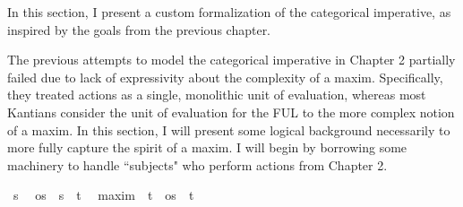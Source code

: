 %
\begin{isabellebody}%
%
%
\isadelimtheory
%
\endisadelimtheory
%
\isatagtheory
%
\endisatagtheory
{\isafoldtheory}%
%
\isadelimtheory
%
\endisadelimtheory
%
\isadelimdocument
%
\endisadelimdocument
%
\isatagdocument
%
\isamarkuptrue%
%
\endisatagdocument
{\isafolddocument}%
%
\isadelimdocument
%
\endisadelimdocument
%
\begin{isamarkuptext}%
In this section, I present a custom formalization of the categorical imperative, as inspired by 
the goals from the previous chapter.%
\end{isamarkuptext}\isamarkuptrue%
%
\isadelimdocument
%
\endisadelimdocument
%
\isatagdocument
%
\isamarkuptrue%
%
\endisatagdocument
{\isafolddocument}%
%
\isadelimdocument
%
\endisadelimdocument
%
\begin{isamarkuptext}%
The previous attempts to model the categorical imperative in Chapter 2 partially failed due to 
lack of expressivity about the complexity of a maxim. Specifically, they treated actions as a single, 
monolithic unit of evaluation, whereas most Kantians consider the unit of evaluation for the FUL to the more
complex notion of a maxim. In this section, I will present some logical background necessarily to more fully 
capture the spirit of a maxim. I will begin by borrowing some machinery to handle ``subjects" who perform 
actions from Chapter 2.%
\end{isamarkuptext}\isamarkuptrue%
\isamarkupfalse%
\ s\ %
\isanewline
{}\isamarkupfalse%
\ os\ {\isacharequal}\ {\isachardoublequoteopen}{\isacharparenleft}s\ {\isasymRightarrow}\ t{\isacharparenright}{\isachardoublequoteclose}\ %
\isanewline
\isanewline
{}\isamarkupfalse%
\ maxim\ {\isacharequal}\ {\isachardoublequoteopen}{\isacharparenleft}t\ {\isacharasterisk}\ os\ {\isacharasterisk}\ t{\isacharparenright}{\isachardoublequoteclose}\ %
\end{isabellebody}
